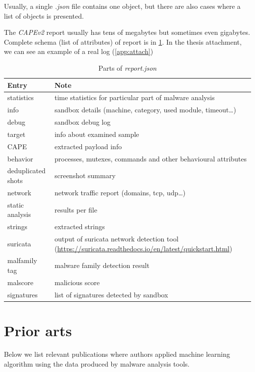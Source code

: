 Usually, a single \emph{.json} file contains one object, but there are also cases where a list of objects is presented.

The \emph{CAPEv2} report usually has tens of megabytes but sometimes even gigabytes. Complete schema (list of attributes) of report is in \ref{tab:report}. In the thesis attachment, we can see an example of a real log (\ref{app:attach})

\begin{table}[h]
  \centering
  \caption{Parts of \emph{report.json}}
  \begin{tabular}{p{4cm}p{10cm}} 
      \toprule
      \textbf{Entry} &
      \textbf{Note} \\
      \midrule
      statistics & time statistics for particular part of malware analysis \\
      \midrule
      info & sandbox details (machine, category, used module, timeout\dots) \\
      \midrule
      debug & sandbox debug log \\
      \midrule
      target &  info about examined sample\\
      \midrule
      CAPE & extracted payload info \\
      \midrule
      behavior & processes, mutexes, commands and other behavioural attributes \\
      \midrule
      deduplicated shots & screenshot summary \\
      \midrule
      network & network traffic report (domains, tcp, udp\dots) \\
      \midrule
      static analysis & results per file \\
      \midrule
      strings & extracted strings \\
      \midrule
      suricata &  output of suricata network detection tool (\url{https://suricata.readthedocs.io/en/latest/quickstart.html})\\
      \midrule
      malfamily tag &  malware family detection result\\
      \midrule
      malscore &  malicious score\\
      \midrule
      signatures &  list of signatures detected by sandbox \\
      \bottomrule
  \end{tabular}
  \label{tab:report}
\end{table}

\section{Prior arts}
Below we list relevant publications where authors applied machine learning algorithm using the data produced by malware analysis tools.
